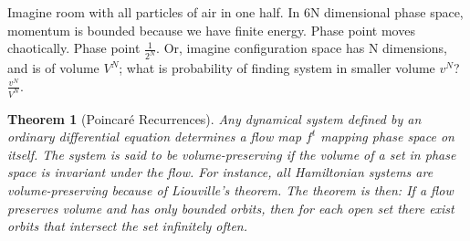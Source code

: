 \documentclass[]{article}
\newtheorem{thm}{Theorem}
\begin{document}
Imagine room with all particles of air in one half. In 6N dimensional phase space, momentum is bounded because we have finite energy. Phase point moves chaotically. Phase point $\frac{1}{2^N}$. Or, imagine configuration space has N dimensions, and is of volume $V^N$; what is probability of finding system in smaller volume $v^N$? $\frac{v^N}{V^N}$. 

\begin{thm}[Poincar\'e Recurrences]
	Any dynamical system defined by an ordinary differential equation determines a flow map $f^t$ mapping phase space on itself. The system is said to be volume-preserving if the volume of a set in phase space is invariant under the flow. For instance, all Hamiltonian systems are volume-preserving because of Liouville's theorem. The theorem is then: If a flow preserves volume and has only bounded orbits, then for each open set there exist orbits that intersect the set infinitely often.
\end{thm}
\end{document}
